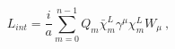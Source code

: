 \begin{equation}
L_{int}= \frac{i}{a}\sum_{m=0}^{n-1} 
Q_m\bar\chi_m^L\gamma^\mu \chi_m^L W_\mu~,
\end{equation}

